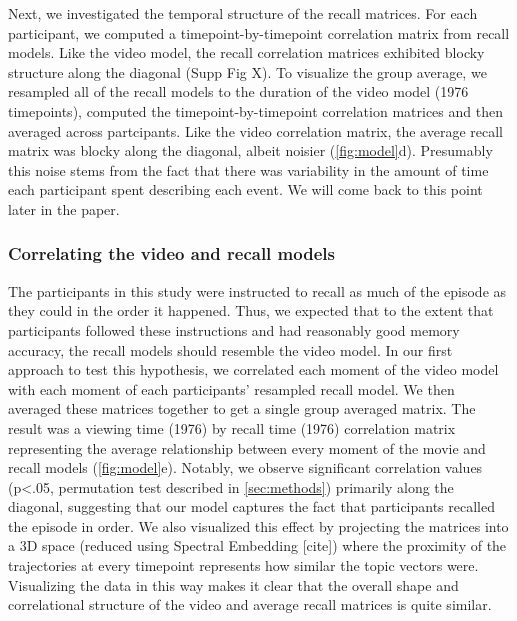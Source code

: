 \documentclass[a4paper,man,natbib,floatsintext]{apa6}
\begin{document}
Next, we investigated the temporal structure of the recall matrices. For each participant, we computed a timepoint-by-timepoint correlation matrix from recall models. Like the video model, the recall correlation matrices exhibited blocky structure along the diagonal (Supp Fig X). To visualize the group average, we resampled all of the recall models to the duration of the video model (1976 timepoints), computed the timepoint-by-timepoint correlation matrices and then averaged across partcipants.  Like the video correlation matrix, the average recall matrix was blocky along the diagonal, albeit noisier (\ref{fig:model}d).  Presumably this noise stems from the fact that there was variability in the amount of time each participant spent describing each event. We will come back to this point later in the paper.

\subsubsection{Correlating the video and recall models}
The participants in this study were instructed to recall as much of the episode as they could in the order it happened.  Thus, we expected that to the extent that participants followed these instructions and had reasonably good memory accuracy, the recall models should resemble the video model. In our first approach to test this hypothesis, we correlated each moment of the video model with each moment of each participants' resampled recall model. We then averaged these matrices together to get a single group averaged matrix.  The result was a viewing time (1976) by recall time (1976) correlation matrix representing the average relationship between every moment of the movie and recall models (\ref{fig:model}e). Notably, we observe significant correlation values (p<.05, permutation test described in \ref{sec:methods}) primarily along the diagonal, suggesting that our model captures the fact that participants recalled the episode in order. We also visualized this effect by projecting the matrices into a 3D space (reduced using Spectral Embedding [cite]) where the proximity of the trajectories at every timepoint represents how similar the topic vectors were. Visualizing the data in this way makes it clear that the overall shape and correlational structure of the video and average recall matrices is quite similar.
\end{document}
